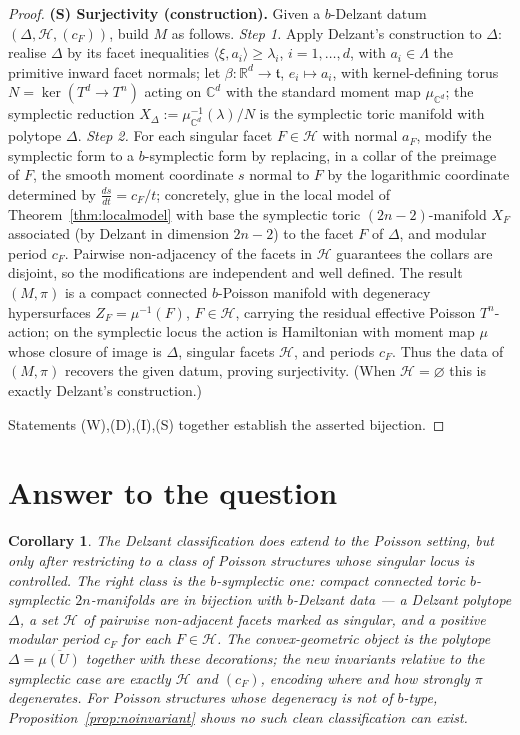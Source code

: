 \documentclass{amsart}
\newtheorem{corollary}{Corollary}
\theoremstyle{definition}
\begin{document}
\begin{proof}
\medskip
\noindent\textbf{(S) Surjectivity (construction).}
Given a $b$-Delzant datum $(\Delta,\mathcal H,(c_F))$, build $M$ as follows.
\emph{Step 1.} Apply Delzant's construction to $\Delta$: realise $\Delta$ by
its facet inequalities $\langle\xi,a_i\rangle\ge\lambda_i$, $i=1,\dots,d$, with
$a_i\in\Lambda$ the primitive inward facet normals; let
$\beta\colon\mathbb R^d\to\mathfrak t$, $e_i\mapsto a_i$, with kernel-defining
torus $N=\ker(T^d\to T^n)$ acting on $\mathbb C^d$ with the standard moment map
$\mu_{\mathbb C^d}$; the symplectic reduction
$X_\Delta:=\mu_{\mathbb C^d}^{-1}(\lambda)/N$ is the symplectic toric manifold
with polytope $\Delta$. \emph{Step 2.} For each singular facet $F\in\mathcal H$
with normal $a_F$, modify the symplectic form to a $b$-symplectic form by
replacing, in a collar of the preimage of $F$, the smooth moment coordinate
$s$ normal to $F$ by the logarithmic coordinate determined by
$\frac{ds}{dt}=c_F/t$; concretely, glue in the local model of
Theorem~\ref{thm:localmodel} with base the symplectic toric
$(2n-2)$-manifold $X_F$ associated (by Delzant in dimension $2n-2$) to the
facet $F$ of $\Delta$, and modular period $c_F$. Pairwise non-adjacency of the
facets in $\mathcal H$ guarantees the collars are disjoint, so the
modifications are independent and well defined. The result $(M,\pi)$ is a
compact connected $b$-Poisson manifold with degeneracy hypersurfaces
$Z_F=\mu^{-1}(F)$, $F\in\mathcal H$, carrying the residual effective Poisson
$T^n$-action; on the symplectic locus the action is Hamiltonian with moment map
$\mu$ whose closure of image is $\Delta$, singular facets $\mathcal H$, and
periods $c_F$. Thus the data of $(M,\pi)$ recovers the given datum, proving
surjectivity. (When $\mathcal H=\varnothing$ this is exactly Delzant's
construction.)

\medskip
Statements (W),(D),(I),(S) together establish the asserted bijection.
\end{proof}

\section{Answer to the question}

\begin{corollary}
The Delzant classification \emph{does} extend to the Poisson setting, but only
after restricting to a class of Poisson structures whose singular locus is
controlled. The right class is the $b$-symplectic one: compact connected toric
$b$-symplectic $2n$-manifolds are in bijection with $b$-Delzant data --- a
Delzant polytope $\Delta$, a set $\mathcal H$ of pairwise non-adjacent facets
marked as singular, and a positive modular period $c_F$ for each $F\in\mathcal
H$. The convex-geometric object is the polytope $\Delta=\overline{\mu(U)}$
together with these decorations; the new invariants relative to the symplectic
case are exactly $\mathcal H$ and $(c_F)$, encoding where and how strongly
$\pi$ degenerates. For Poisson structures whose degeneracy is \emph{not} of
$b$-type, Proposition~\ref{prop:noinvariant} shows no such clean classification
can exist.
\end{corollary}
\end{document}
